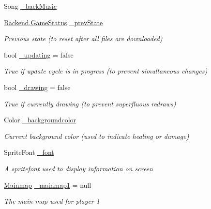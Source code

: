 \begin{DoxyCompactItemize}
Song \hyperlink{class_gruppe22_1_1_client_1_1_game_win_ac55e767d1594960d931ba76935659afe}{\-\_\-back\-Music}
\item 
\hyperlink{namespace_gruppe22_1_1_backend_ad81bf4712f53c2ad4194343b6b0c73d2}{Backend.\-Game\-Status} \hyperlink{class_gruppe22_1_1_client_1_1_game_win_a5ee0952fc213d5c3ae63698876a30ace}{\-\_\-prev\-State}
\begin{DoxyCompactList}\small\item\em Previous state (to reset after all files are downloaded) \end{DoxyCompactList}\item 
bool \hyperlink{class_gruppe22_1_1_client_1_1_game_win_af535ea47ceef795b292d3b831a628e32}{\-\_\-updating} = false
\begin{DoxyCompactList}\small\item\em True if update cycle is in progress (to prevent simultaneous changes) \end{DoxyCompactList}\item 
bool \hyperlink{class_gruppe22_1_1_client_1_1_game_win_a26adf6b2a5887176e083bace5b930d58}{\-\_\-drawing} = false
\begin{DoxyCompactList}\small\item\em True if currently drawing (to prevent superfluous redraws) \end{DoxyCompactList}\item 
Color \hyperlink{class_gruppe22_1_1_client_1_1_game_win_a1d439f242a800c7bf3dcf287bc2672d2}{\-\_\-backgroundcolor}
\begin{DoxyCompactList}\small\item\em Current background color (used to indicate healing or damage) \end{DoxyCompactList}\item 
Sprite\-Font \hyperlink{class_gruppe22_1_1_client_1_1_game_win_abb8bed1c5a9835889c4cf3cfdcf55565}{\-\_\-font}
\begin{DoxyCompactList}\small\item\em A spritefont used to display information on screen \end{DoxyCompactList}\item 
\hyperlink{class_gruppe22_1_1_client_1_1_mainmap}{Mainmap} \hyperlink{class_gruppe22_1_1_client_1_1_game_win_a8ca9d96b533860c16cfe62f37318c3f4}{\-\_\-mainmap1} = null
\begin{DoxyCompactList}\small\item\em The main map used for player 1 \end{DoxyCompactList}\item 

\end{DoxyCompactItemize}
